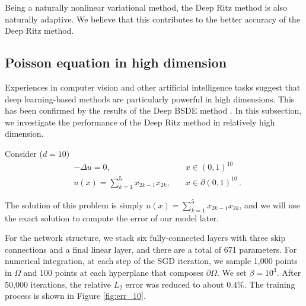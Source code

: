 \documentclass[a4paper,12pt]{article}
\begin{document}



Being a naturally nonlinear variational method, the Deep Ritz method
is also naturally adaptive. We believe that this contributes to the
better accuracy of the Deep Ritz method.

\subsection{Poisson equation in high dimension}

Experiences in computer vision and other artificial intelligence
tasks suggest that deep learning-based methods are particularly powerful
in high dimensions. This has been confirmed by the results of
the Deep BSDE method \cite{Han-Jentzen-E}.  
In this subsection, we investigate the performance
of the Deep Ritz method in relatively high dimension.

Consider  ($d=10$)
\begin{equation}
\begin{aligned}
&-\Delta u=0, \quad &x \in (0,1)^{10}\\
&u(x)=\sum_{k=1}^{5} x_{2k-1} x_{2k}, \quad &x \in \partial (0,1)^{10}\,.
\end{aligned}
\end{equation}

The solution of this problem is simply $u(x)=\sum_{k=1}^{5} x_{2k-1} x_{2k}$, and we will use the exact solution to compute the error of our model later. 



For the network structure, we stack six fully-connected layers with three skip connections and a final linear layer, and there are a total of 671 parameters.
For numerical integration, at each step of the SGD iteration,
we sample 1,000 points in $\Omega$ and 100 points at each hyperplane that composes $\partial \Omega$. We set $\beta=10^3$. 
After 50,000 iterations, the relative $L_2$ error was reduced to
about $0.4\%$. The training process is shown in
Figure \ref{fig:err_10}.
\end{document}
